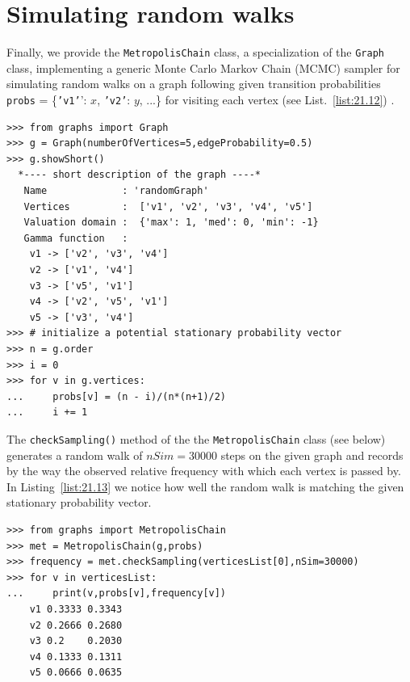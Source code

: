 \section{Simulating \Metropolis random walks}
\label{sec:21.6}

Finally, we provide the \texttt{MetropolisChain} class, a specialization of the \texttt{Graph} class, implementing a generic Monte Carlo Markov Chain (MCMC) sampler for simulating random walks on a graph following given transition probabilities \texttt{probs} = \{\texttt{'v1'}’: $x$, \texttt{'v2'}: $y$, ...\} for visiting each vertex (see List.~\vref{list:21.12})
\citep{MET-1953}.
\begin{lstlisting}[caption={Simulating random walks on a graph},label=list:21.12]
>>> from graphs import Graph
>>> g = Graph(numberOfVertices=5,edgeProbability=0.5)
>>> g.showShort()
  *---- short description of the graph ----*
   Name             : 'randomGraph'
   Vertices         :  ['v1', 'v2', 'v3', 'v4', 'v5']
   Valuation domain :  {'max': 1, 'med': 0, 'min': -1}
   Gamma function   :
    v1 -> ['v2', 'v3', 'v4']
    v2 -> ['v1', 'v4']
    v3 -> ['v5', 'v1']
    v4 -> ['v2', 'v5', 'v1']
    v5 -> ['v3', 'v4']
>>> # initialize a potential stationary probability vector 
>>> n = g.order
>>> i = 0
>>> for v in g.vertices:
...     probs[v] = (n - i)/(n*(n+1)/2)
...     i += 1
\end{lstlisting}

The \texttt{checkSampling()} method  of the the \texttt{MetropolisChain} class (see below) generates a random walk of $nSim = 30000$ steps on the given graph and records by the way the observed relative frequency with which each vertex is passed by. In Listing~\vref{list:21.13} we notice how well the random walk is matching the given stationary probability vector.
\begin{lstlisting}[caption={Checking the quality of the MCMC sampler},label=list:21.13]
>>> from graphs import MetropolisChain     
>>> met = MetropolisChain(g,probs)
>>> frequency = met.checkSampling(verticesList[0],nSim=30000)
>>> for v in verticesList:
...     print(v,probs[v],frequency[v])   
    v1 0.3333 0.3343
    v2 0.2666 0.2680
    v3 0.2    0.2030
    v4 0.1333 0.1311
    v5 0.0666 0.0635
\end{lstlisting}

